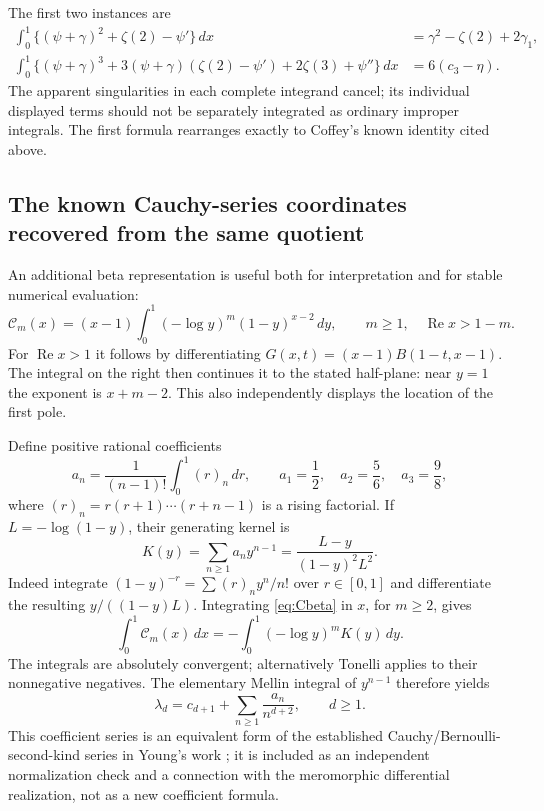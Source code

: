 \documentclass[11pt,a4paper]{article}
\numberwithin{equation}{section}
\theoremstyle{definition}
\newcommand{\CM}{\mathcal C}
\newcommand{\re}{\operatorname{Re}}
\begin{document}
The first two instances are
\begin{align}
 \int_0^1\{(\psi+\gamma)^2+\zeta(2)-\psi'\}\,dx
   &=\gamma^2-\zeta(2)+2\gamma_1,\label{eq:C2integral}\\
 \int_0^1\{(\psi+\gamma)^3
      +3(\psi+\gamma)(\zeta(2)-\psi')
      +2\zeta(3)+\psi''\}\,dx
   &=6(c_3-\eta).
 \label{eq:C3integral}
\end{align}
The apparent singularities in each complete integrand cancel; its
individual displayed terms should not be separately integrated as
ordinary improper integrals. The first formula rearranges exactly to
Coffey's known identity cited above.

\subsection{The known Cauchy-series coordinates recovered from the same quotient}

An additional beta representation is useful both for interpretation
and for stable numerical evaluation:
\begin{equation}\label{eq:Cbeta}
 \CM_m(x)=(x-1)\int_0^1(-\log y)^m(1-y)^{x-2}\,dy,
       \qquad m\ge1,\quad\re x>1-m.
\end{equation}
For $\re x>1$ it follows by differentiating
$G(x,t)=(x-1)B(1-t,x-1)$. The integral on the right then continues
it to the stated half-plane: near $y=1$ the exponent is $x+m-2$.
This also independently displays the location of the first pole.

Define positive rational coefficients
\begin{equation}\label{eq:an}
 a_n=\frac1{(n-1)!}\int_0^1(r)_n\,dr,
 \qquad a_1=\frac12,\quad a_2=\frac56,\quad a_3=\frac98,
\end{equation}
where $(r)_n=r(r+1)\cdots(r+n-1)$ is a rising factorial. If
$L=-\log(1-y)$, their generating kernel is
\begin{equation}\label{eq:Kkernel}
 K(y)=\sum_{n\ge1}a_ny^{n-1}
      =\frac{L-y}{(1-y)^2L^2}.
\end{equation}
Indeed integrate $(1-y)^{-r}=\sum (r)_ny^n/n!$ over $r\in[0,1]$
and differentiate the resulting $y/((1-y)L)$.
Integrating \eqref{eq:Cbeta} in $x$, for $m\ge2$, gives
\[
 \int_0^1\CM_m(x)\,dx
   =-\int_0^1(-\log y)^m K(y)\,dy.
\]
The integrals are absolutely convergent; alternatively Tonelli applies
to their nonnegative negatives. The elementary Mellin integral of
$y^{n-1}$ therefore yields
\begin{equation}\label{eq:knowncauchy}
 \boxed{\displaystyle
 \lambda_d=c_{d+1}+\sum_{n\ge1}\frac{a_n}{n^{d+2}},
       \qquad d\ge1.}
\end{equation}
This coefficient series is an equivalent form of the established
Cauchy/Bernoulli-second-kind series in Young's work
\cite{Young2023,Young2024}; it is included as an independent
normalization check and a connection with the meromorphic differential
realization, not as a new coefficient formula.
\end{document}
